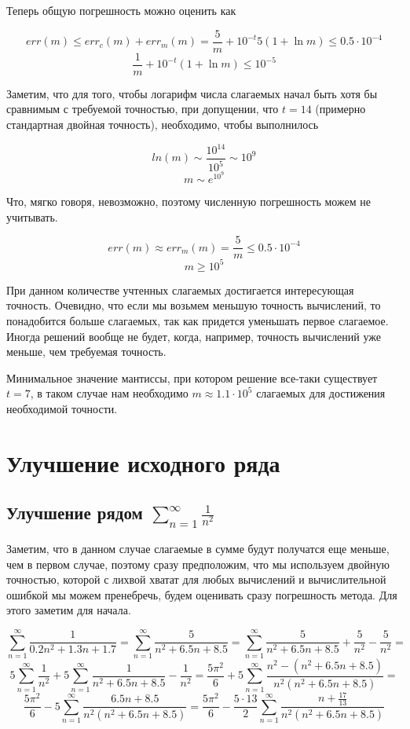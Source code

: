 \documentclass[11pt,a4paper,oneside]{article}
\begin{document}
Теперь общую погрешность можно оценить как

$$ err(m) \le err_{c}(m) + err_{m}(m) = \frac{5}{m} + 10^{-t} 5 (1 + \ln m)
	\le 0.5 \cdot 10^{-4} $$
$$ \frac{1}{m} + 10^{-t} (1 + \ln m) \le 10^{-5} $$

Заметим, что для того, чтобы логарифм числа слагаемых начал быть хотя бы сравнимым с требуемой точностью, при допущении, что $t = 14$ (примерно стандартная двойная точность), необходимо, чтобы выполнилось

$$ ln(m) \sim \frac{10^{14}}{10^5} \sim 10^{9} $$
$$ m \sim e^{10^{9}} $$

Что, мягко говоря, невозможно, поэтому численную погрешность можем не учитывать.

$$ err(m) \approx err_{m}(m) = \frac{5}{m} \le 0.5 \cdot 10^{-4} $$
$$ m \ge 10^5 $$

При данном количестве учтенных слагаемых достигается интересующая точность. Очевидно, что если мы возьмем меньшую точность вычислений, то понадобится больше слагаемых, так как придется уменьшать первое слагаемое. Иногда решений вообще не будет, когда, например, точность вычислений уже меньше, чем требуемая точность.

Минимальное значение мантиссы, при котором решение все-таки существует $t = 7$, в таком случае нам необходимо $m \approx 1.1 \cdot 10^5 $ слагаемых для достижения необходимой точности.

\section{Улучшение исходного ряда}

\subsection{Улучшение рядом $ \sum_{n = 1}^{\infty} \frac{1}{n^2} $}
	
Заметим, что в данном случае слагаемые в сумме будут получатся еще меньше, чем в первом случае, поэтому сразу предположим, что мы используем двойную точностью, которой с лихвой хватат для любых вычислений и вычислительной ошибкой мы можем пренебречь, будем оценивать сразу погрешность метода. Для этого заметим для начала.

$$ \sum_{n = 1}^{\infty} \frac{1}{0.2n^2 + 1.3n + 1.7} =
	\sum_{n = 1}^{\infty} \frac{5}{n^2 + 6.5n + 8.5} =
	\sum_{n = 1}^{\infty} \frac{5}{n^2 + 6.5n + 8.5} + \frac{5}{n^2} - \frac{5}{n^2} = $$
$$ 5 \sum_{n = 1}^{\infty} \frac{1}{n^2} +
	5 \sum_{n = 1}^{\infty} \frac{1}{n^2 + 6.5n + 8.5} - \frac{1}{n^2} = 
	\frac{5\pi^2}{6} +
	5 \sum_{n = 1}^{\infty} \frac{n^2 - (n^2 + 6.5n + 8.5)}{n^2 (n^2 + 6.5n + 8.5)} = $$
$$ \frac{5\pi^2}{6} -
	5 \sum_{n = 1}^{\infty} \frac{6.5n + 8.5}{n^2 (n^2 + 6.5n + 8.5)} = 
	\frac{5\pi^2}{6} -
	\frac{5 \cdot 13}{2} \sum_{n = 1}^{\infty} \frac{n + \frac{17}{13}}{n^2 (n^2 + 6.5n + 8.5)}$$
	
\end{document}
